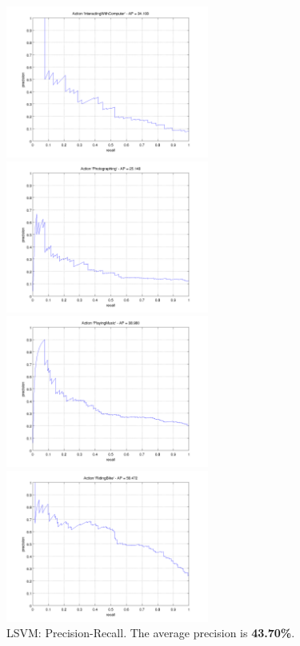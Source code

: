 \documentclass[10pt,a4paper]{llncs}
\begin{document}
\begin{figure}
\caption{LSVM: Precision-Recall. The average precision is \textbf{43.70\%}.}
\label{fig:LSVM_PR}
\begin{minipage}{0.5\linewidth}
\includegraphics[height=5cm]{img/LSVM_PR_InteractingWithComputer.png}
\end{minipage}
\begin{minipage}{0.5\linewidth}
\includegraphics[height=5cm]{img/LSVM_PR_Photographing.png}
\end{minipage}
\begin{minipage}{0.5\linewidth}
\includegraphics[height=5cm]{img/LSVM_PR_PlayingMusic.png}
\end{minipage}
\begin{minipage}{0.5\linewidth}
\includegraphics[height=5cm]{img/LSVM_PR_RidingBike.png}

\end{minipage}
\end{figure}
\end{document}
